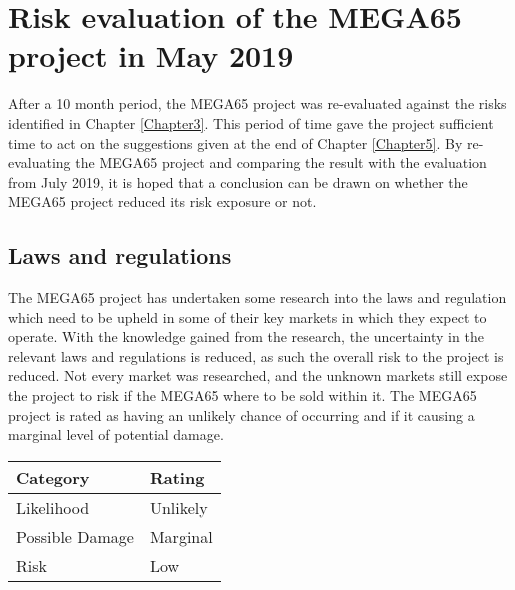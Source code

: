 
\chapter{Risk evaluation of the MEGA65 project in May 2019}
\label{Chapter6}
After a 10 month period, the MEGA65 project was re-evaluated against the risks identified in Chapter \ref{Chapter3}. This period of time gave the project sufficient time to act on the suggestions given at the end of Chapter \ref{Chapter5}. By re-evaluating the MEGA65 project and comparing the result with the evaluation from July 2019, it is hoped that a conclusion can be drawn on whether the MEGA65 project reduced its risk exposure or not. 

\section{Laws and regulations}
The MEGA65 project has undertaken some research into the laws and regulation which need to be upheld in some of their key markets in which they expect to operate. With the knowledge gained from the research, the uncertainty in the relevant laws and regulations is reduced, as such the overall risk to the project is reduced. Not every market was researched, and the unknown markets still expose the project to risk if the MEGA65 where to be sold within it. The MEGA65 project is rated as having an unlikely chance of occurring and if it causing a marginal level of potential damage. \\

\begin{tabular}{l|l} %
    	\textbf{Category} 	&	\textbf{Rating} \\
      \hline
     Likelihood			&	Unlikely \\
     Possible Damage 	& 	Marginal \\
     Risk 				&	Low		\\	
    \end{tabular}



